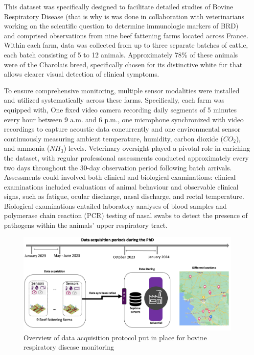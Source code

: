 This dataset was specifically designed to facilitate detailed studies of Bovine Respiratory Disease (that is why is was done in collaboration with veterinarians working on the scientific question to determine immunologic markers of BRD) and comprised observations from nine beef fattening farms located across France. Within each farm, data was collected from up to three separate batches of cattle, each batch consisting of 5 to 12 animals. Approximately 78\% of these animals were of the Charolais breed, specifically chosen for its distinctive white fur that allows clearer visual detection of clinical symptoms.

To ensure comprehensive monitoring, multiple sensor modalities were installed and utilized systematically across these farms. Specifically, each farm was equipped with, One fixed video camera recording daily segments of 5 minutes every hour between 9 a.m. and 6 p.m., one microphone synchronized with video recordings to capture acoustic data concurrently and one environmental sensor continuously measuring ambient temperature, humidity, carbon dioxide ($CO_2$), and ammonia ($NH_3$) levels. Veterinary oversight played a pivotal role in enriching the dataset, with regular professional assessments conducted approximately every two days throughout the 30-day observation period following batch arrivals. Assessments could involved both clinical and biological examinations: clinical examinations included evaluations of animal behaviour and observable clinical signs, such as fatigue, ocular discharge, nasal discharge, and rectal temperature. Biological examinations entailed laboratory analyses of blood samples and polymerase chain reaction (PCR) testing of nasal swabs to detect the presence of pathogens within the animals’ upper respiratory tract.

\begin{figure}[h]
  \includegraphics[width=\linewidth]{figures/chap1/data collection.jpg}
  \caption{Overview of data acquisition protocol put in place for bovine respiratory disease monitoring}
  \label{fig:chap1-DataCollection}
\end{figure}

